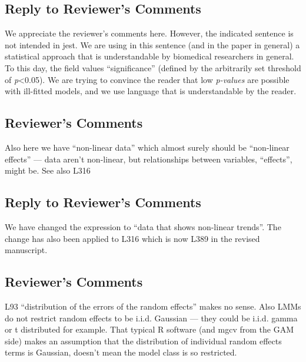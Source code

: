 \documentclass[
]{article}
\begin{document}
\hypertarget{section-18}{%
\subsection{\texorpdfstring{\textcolor{reviewersblue} {Reply to Reviewer's Comments}}{}}\label{section-18}}

We appreciate the reviewer's comments here. However, the indicated sentence is not intended in jest. We are using in this sentence (and in the paper in general) a statistical approach that is understandable by biomedical researchers in general. To this day, the field values ``significance'' (defined by the arbitrarily set threshold of \emph{p}\textless0.05). We are trying to convince the reader that low \emph{p-values} are possible with ill-fitted models, and we use language that is understandable by the reader.

\hypertarget{reviewers-comments-18}{%
\subsection{Reviewer's Comments}\label{reviewers-comments-18}}

Also here we have ``non-linear data'' which almost surely should be ``non-linear effects'' --- data aren't non-linear, but relationships between variables, ``effects'', might be. See also L316

\hypertarget{section-19}{%
\subsection{\texorpdfstring{\textcolor{reviewersblue} {Reply to Reviewer's Comments}}{}}\label{section-19}}

We have changed the expression to ``data that shows non-linear trends''. The change has also been applied to L316 which is now L389 in the revised manuscript.

\hypertarget{reviewers-comments-19}{%
\subsection{Reviewer's Comments}\label{reviewers-comments-19}}

L93 ``distribution of the errors of the random effects'' makes no sense. Also LMMs do not restrict random effects to be i.i.d. Gaussian --- they could be i.i.d. gamma or t distributed for example. That typical R software (and mgcv from the GAM side) makes an assumption that the distribution of individual random effects terms is Gaussian, doesn't mean the model class is so restricted.
\end{document}

